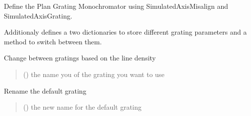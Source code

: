 \documentclass[letterpaper,10pt,english]{sphinxmanual}
\begin{document}
\begin{fulllineitems}
\label{\detokenize{API:raypyng_bluesky.devices.SimulatedPGM}}
\pysigstartsignatures
{}
\pysigstopsignatures
\sphinxAtStartPar
Define the Plan Grating Monochromator using SimulatedAxisMisalign
and SimulatedAxisGrating.

\sphinxAtStartPar
Additionaly defines a two dictionaries to store different grating parameters
and a method   to switch between them.

\begin{fulllineitems}
\label{\detokenize{API:raypyng_bluesky.devices.SimulatedPGM.change_grating}}
\pysigstartsignatures
{}
\pysigstopsignatures
\sphinxAtStartPar
Change between gratings based on the line density
\begin{quote}\begin{description}
\sphinxAtStartPar
{} () \textendash{} the name you of the grating you want to use

\end{description}\end{quote}

\end{fulllineitems}


\begin{fulllineitems}
\label{\detokenize{API:raypyng_bluesky.devices.SimulatedPGM.rename_default_grating}}
\pysigstartsignatures
{}
\pysigstopsignatures
\sphinxAtStartPar
Rename the default grating
\begin{quote}\begin{description}
\sphinxAtStartPar
{} () \textendash{} the new name for the default grating


\end{description}
\end{quote}
\end{fulllineitems}
\end{fulllineitems}
\end{document}
